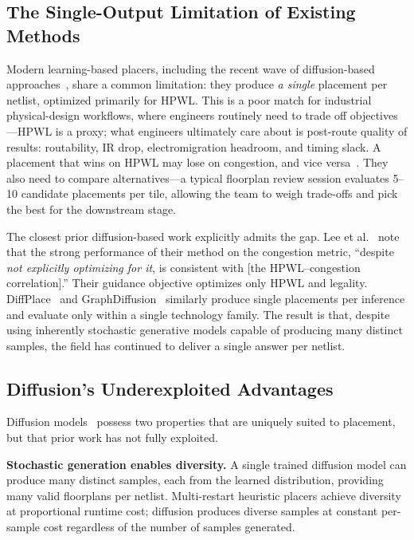 \documentclass[lettersize,journal]{IEEEtran}
\begin{document}
\subsection{The Single-Output Limitation of Existing Methods}

Modern learning-based placers, including the recent wave of diffusion-based approaches~\cite{lee2024chipdiffusion, fang2025graphdiffusion, trung2025diffplace, yoon2025geometric}, share a common limitation: they produce \emph{a single} placement per netlist, optimized primarily for HPWL. This is a poor match for industrial physical-design workflows, where engineers routinely need to trade off objectives---HPWL is a proxy; what engineers ultimately care about is post-route quality of results: routability, IR drop, electromigration headroom, and timing slack. A placement that wins on HPWL may lose on congestion, and vice versa~\cite{cheng2024rethinking}. They also need to compare alternatives---a typical floorplan review session evaluates 5--10 candidate placements per tile, allowing the team to weigh trade-offs and pick the best for the downstream stage.

The closest prior diffusion-based work explicitly admits the gap. Lee et al.~\cite{lee2024chipdiffusion} note that the strong performance of their method on the congestion metric, ``despite \emph{not explicitly optimizing for it}, is consistent with [the HPWL--congestion correlation].'' Their guidance objective optimizes only HPWL and legality. DiffPlace~\cite{trung2025diffplace} and GraphDiffusion~\cite{fang2025graphdiffusion} similarly produce single placements per inference and evaluate only within a single technology family. The result is that, despite using inherently stochastic generative models capable of producing many distinct samples, the field has continued to deliver a single answer per netlist.

\subsection{Diffusion's Underexploited Advantages}

Diffusion models~\cite{ho2020ddpm, song2021ddim} possess two properties that are uniquely suited to placement, but that prior work has not fully exploited.

\textbf{Stochastic generation enables diversity.} A single trained diffusion model can produce many distinct samples, each from the learned distribution, providing many valid floorplans per netlist. Multi-restart heuristic placers achieve diversity at proportional runtime cost; diffusion produces diverse samples at constant per-sample cost regardless of the number of samples generated.
\end{document}
